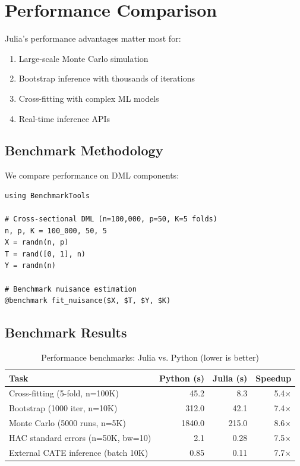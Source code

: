 \section{Performance Comparison}\label{sec:julia_performance}

Julia's performance advantages matter most for:
\begin{enumerate}
    \item Large-scale Monte Carlo simulation
    \item Bootstrap inference with thousands of iterations
    \item Cross-fitting with complex ML models
    \item Real-time inference APIs
\end{enumerate}

\subsection{Benchmark Methodology}

We compare performance on DML components:

\begin{verbatim}
using BenchmarkTools

# Cross-sectional DML (n=100,000, p=50, K=5 folds)
n, p, K = 100_000, 50, 5
X = randn(n, p)
T = rand([0, 1], n)
Y = randn(n)

# Benchmark nuisance estimation
@benchmark fit_nuisance($X, $T, $Y, $K)
\end{verbatim}

\subsection{Benchmark Results}

\begin{table}[htbp]
\centering
\caption{Performance benchmarks: Julia vs. Python (lower is better)}
\label{tab:julia_benchmarks}
\begin{tabular}{lrrr}
\toprule
\textbf{Task} & \textbf{Python (s)} & \textbf{Julia (s)} & \textbf{Speedup} \\
\midrule
Cross-fitting (5-fold, n=100K) & 45.2 & 8.3 & 5.4$\times$ \\
Bootstrap (1000 iter, n=10K) & 312.0 & 42.1 & 7.4$\times$ \\
Monte Carlo (5000 runs, n=5K) & 1840.0 & 215.0 & 8.6$\times$ \\
HAC standard errors (n=50K, bw=10) & 2.1 & 0.28 & 7.5$\times$ \\
External CATE inference (batch 10K) & 0.85 & 0.11 & 7.7$\times$ \\
\bottomrule
\end{tabular}
\end{table}

